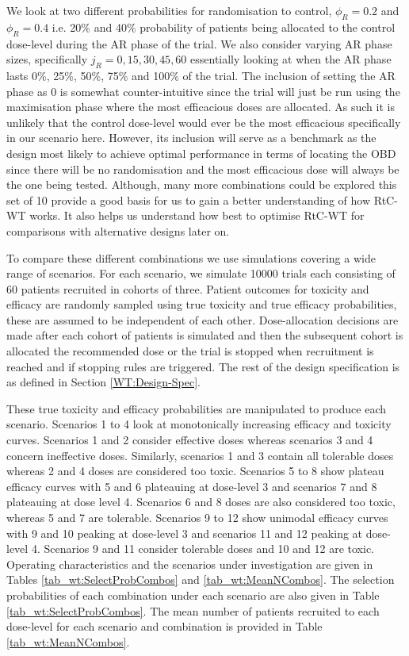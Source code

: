  We look at two different probabilities for randomisation to control, $\phi_R = 0.2$ and $\phi_R = 0.4$ i.e. 20\% and 40\% probability of patients being allocated to the control dose-level during the AR phase of the trial. We also consider varying AR phase sizes, specifically $j_R = 0, 15, 30, 45 ,60$ essentially looking at when the AR phase lasts 0\%, 25\%, 50\%, 75\% and 100\% of the trial. The inclusion of setting the AR phase as 0 is somewhat counter-intuitive since the trial will just be run using the maximisation phase where the most efficacious doses are allocated. As such it is unlikely that the control dose-level would ever be the most efficacious specifically in our scenario here. However, its inclusion will serve as a benchmark as the design most likely to achieve optimal performance in terms of locating the OBD since there will be no randomisation and the most efficacious dose will always be the one being tested. Although, many more combinations could be explored this set of 10 provide a good basis for us to gain a better understanding of how RtC-WT works. It also helps us understand how best to optimise RtC-WT for comparisons with alternative designs later on.  
 
 To compare these different combinations we use simulations covering a wide range of scenarios. For each scenario, we simulate 10000 trials each consisting of 60 patients recruited in cohorts of three. Patient outcomes for toxicity and efficacy are randomly sampled using true toxicity and true efficacy probabilities, these are assumed to be independent of each other. Dose-allocation decisions are made after each cohort of patients is simulated and then the subsequent cohort is allocated the recommended dose or the trial is stopped when recruitment is reached and if stopping rules are triggered. The rest of the design specification is as defined in Section \ref{WT:Design-Spec}. 
 
 These true toxicity and efficacy probabilities are manipulated to produce each scenario. Scenarios 1 to 4 look at monotonically increasing efficacy and toxicity curves. Scenarios 1 and 2 consider effective doses whereas scenarios 3 and 4 concern ineffective doses. Similarly, scenarios 1 and 3 contain all tolerable doses whereas 2 and 4 doses are considered too toxic. Scenarios 5 to 8 show plateau efficacy curves with 5 and 6 plateauing at dose-level 3 and scenarios 7 and 8 plateauing at dose level 4. Scenarios 6 and 8 doses are also considered too toxic, whereas 5 and 7 are tolerable. Scenarios 9 to 12 show unimodal efficacy curves with 9 and 10 peaking at dose-level 3 and scenarios 11 and 12 peaking at dose-level 4. Scenarios 9 and 11 consider tolerable doses and 10 and 12 are toxic. Operating characteristics and the scenarios under investigation are given in Tables \ref{tab_wt:SelectProbCombos} and \ref{tab_wt:MeanNCombos}. The selection probabilities of each combination under each scenario are also given in Table \ref{tab_wt:SelectProbCombos}. The mean number of patients recruited to each dose-level for each scenario and combination is provided in Table \ref{tab_wt:MeanNCombos}.  
 
